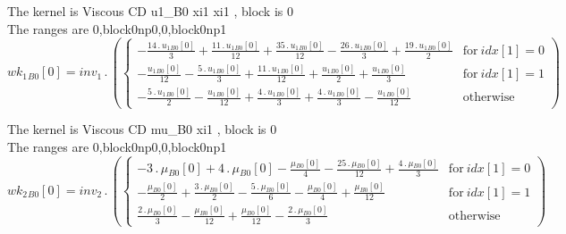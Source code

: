 \documentclass{article}
\begin{document}
\noindent The kernel is Viscous CD u1_B0 xi1 xi1 , block is 0\\\noindent The ranges are 0,block0np0,0,block0np1\\\begin{dmath}{wk_{1}{_{B0}}}[{0}] = inv_1 \,.\, \left(\begin{cases} - \frac{14 \,.\, {u_{1}{_{B0}}}[{0}]}{3} + \frac{11 \,.\, {u_{1}{_{B0}}}[{0}]}{12} + \frac{35 \,.\, {u_{1}{_{B0}}}[{0}]}{12} - \frac{26 \,.\, {u_{1}{_{B0}}}[{0}]}{3} + \frac{19 \,.\, 
{u_{1}{_{B0}}}[{0}]}{2} & \text{for}\: {idx}[{1}] = 0 \\- \frac{{u_{1}{_{B0}}}[{0}]}{12} - \frac{5 \,.\, {u_{1}{_{B0}}}[{0}]}{3} + \frac{11 \,.\, {u_{1}{_{B0}}}[{0}]}{12} + \frac{{u_{1}{_{B0}}}[{0}]}{2} + \frac{{u_{1}{_{B0}}}[{0}]}{3} & \text{for}\: 
{idx}[{1}] = 1 \\- \frac{5 \,.\, {u_{1}{_{B0}}}[{0}]}{2} - \frac{{u_{1}{_{B0}}}[{0}]}{12} + \frac{4 \,.\, {u_{1}{_{B0}}}[{0}]}{3} + \frac{4 \,.\, {u_{1}{_{B0}}}[{0}]}{3} - \frac{{u_{1}{_{B0}}}[{0}]}{12} & \text{otherwise} 
\end{cases}\right)\end{dmath}

\noindent The kernel is Viscous CD mu_B0 xi1 , block is 0\\\noindent The ranges are 0,block0np0,0,block0np1\\\begin{dmath}{wk_{2}{_{B0}}}[{0}] = inv_2 \,.\, \left(\begin{cases} - 3 \,.\, {\mu{_{B0}}}[{0}] + 4 \,.\, {\mu{_{B0}}}[{0}] - \frac{{\mu{_{B0}}}[{0}]}{4} - \frac{25 \,.\, {\mu{_{B0}}}[{0}]}{12} + \frac{4 \,.\, {\mu{_{B0}}}[{0}]}{3} & \text{for}\: 
{idx}[{1}] = 0 \\- \frac{{\mu{_{B0}}}[{0}]}{2} + \frac{3 \,.\, {\mu{_{B0}}}[{0}]}{2} - \frac{5 \,.\, {\mu{_{B0}}}[{0}]}{6} - \frac{{\mu{_{B0}}}[{0}]}{4} + \frac{{\mu{_{B0}}}[{0}]}{12} & \text{for}\: {idx}[{1}] = 1 \\\frac{2 \,.\, 
{\mu{_{B0}}}[{0}]}{3} - \frac{{\mu{_{B0}}}[{0}]}{12} + \frac{{\mu{_{B0}}}[{0}]}{12} - \frac{2 \,.\, {\mu{_{B0}}}[{0}]}{3} & \text{otherwise} \end{cases}\right)\end{dmath}
\end{document}

